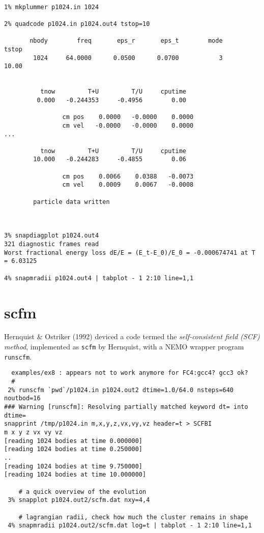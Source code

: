 \footnotesize\begin{verbatim}

1% mkplummer p1024.in 1024

2% quadcode p1024.in p1024.out4 tstop=10

       nbody        freq       eps_r       eps_t        mode       tstop
        1024     64.0000      0.0500      0.0700           3       10.00
 
 
          tnow         T+U         T/U     cputime
         0.000   -0.244353     -0.4956        0.00
 
                cm pos    0.0000   -0.0000    0.0000
                cm vel   -0.0000   -0.0000    0.0000
...

          tnow         T+U         T/U     cputime
        10.000   -0.244283     -0.4855        0.06
 
                cm pos    0.0066    0.0388   -0.0073
                cm vel    0.0009    0.0067   -0.0008
 
        particle data written



3% snapdiagplot p1024.out4
321 diagnostic frames read
Worst fractional energy loss dE/E = (E_t-E_0)/E_0 = -0.000674741 at T = 6.03125

4% snapmradii p1024.out4 | tabplot - 1 2:10 line=1,1

\end{verbatim}\normalsize


\section{scfm}

Hernquist \& Ostriker (1992) deviced a code termed the 
{\it self-consistent field (SCF) method}, implemented as {\tt scfm} by
Hernquist, with a NEMO wrapper program {\tt runscfm}.

\footnotesize\begin{verbatim}
  examples/ex8 : appears not to work anymore for FC4:gcc4? gcc3 ok?
  #
 2% runscfm `pwd`/p1024.in p1024.out2 dtime=1.0/64.0 nsteps=640 noutbod=16
### Warning [runscfm]: Resolving partially matched keyword dt= into dtime=
snapprint /tmp/p1024.in m,x,y,z,vx,vy,vz header=t > SCFBI
m x y z vx vy vz
[reading 1024 bodies at time 0.000000]
[reading 1024 bodies at time 0.250000]
..
[reading 1024 bodies at time 9.750000]
[reading 1024 bodies at time 10.000000]

    # a quick overview of the evolution 
 3% snapplot p1024.out2/scfm.dat nxy=4,4

    # lagrangian radii, check how much the cluster remains in shape
 4% snapmradii p1024.out2/scfm.dat log=t | tabplot - 1 2:10 line=1,1
 

\end{verbatim}\normalsize


